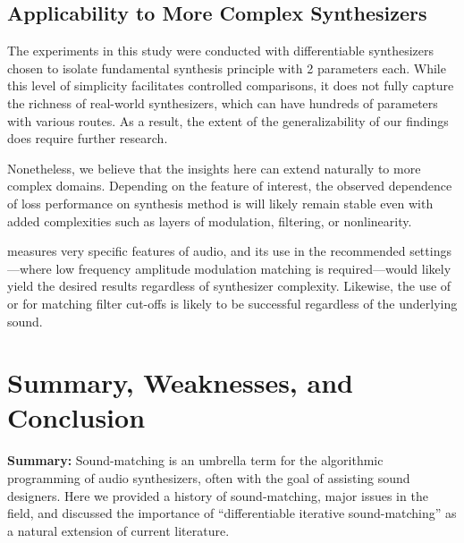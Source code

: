 \subsection{Applicability to More Complex Synthesizers}
The experiments in this study were conducted with differentiable synthesizers chosen to isolate fundamental synthesis principle with 2 parameters each. While this level of simplicity facilitates controlled comparisons, it does not fully capture the richness of real-world synthesizers, which can have hundreds of parameters with various routes. As a result, the extent of the generalizability of our findings does require further research. 

Nonetheless, we believe that the insights here can extend naturally to more complex domains. Depending on the feature of interest, the observed dependence of loss performance on synthesis method is will likely remain stable even with added complexities such as layers of modulation, filtering, or nonlinearity. 

\DTWEnv{} measures very specific features of audio, and its use in the recommended settings---where low frequency amplitude modulation matching is required---would likely yield the desired results regardless of synthesizer complexity. Likewise, the use of \SIMSESpec{} or \LoneSpec{} for matching filter cut-offs is likely to be successful regardless of the underlying sound. 





\section{Summary, Weaknesses, and Conclusion}
\label{sec:summary_conclusion}
\textbf{Summary:} Sound-matching is an umbrella term for the algorithmic programming of audio synthesizers, often with the goal of assisting sound designers. Here we provided a history of sound-matching, major issues in the field, and discussed the importance of ``differentiable iterative sound-matching'' as a natural extension of current literature.

